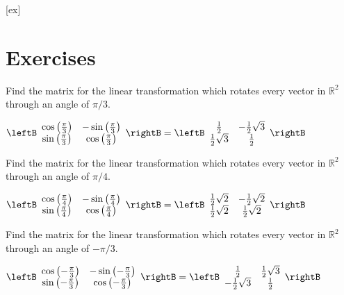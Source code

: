 [ex]
\section*{Exercises}

\begin{enumialphparenastyle}

\begin{ex}  Find the matrix for the linear transformation which
rotates every vector in $\mathbb{R}^{2}$ through an angle of $\pi /3.$
\begin{sol}
$\leftB
\begin{array}{cc}
\cos \left(
\frac{\pi }{3}\right) & -\sin \left( \frac{\pi }{3}\right) \\
\sin \left( \frac{\pi }{3}\right) & \cos \left( \frac{\pi }{3}\right)%
\end{array}
\rightB = \leftB
\begin{array}{cc}
\frac{1}{2} & -\frac{1}{2}\sqrt{3} \\
\frac{1}{2}\sqrt{3} & \frac{1}{2}
\end{array}
\rightB $
\end{sol}
\end{ex}


\begin{ex} Find the matrix for the linear transformation which rotates every
vector in $\mathbb{R}^{2}$ through an angle of $\pi /4.$
\begin{sol}
$\leftB
\begin{array}{cc}
\cos \left( \frac{\pi }{4}\right) & -\sin \left( \frac{\pi }{4}\right) \\
\sin \left( \frac{\pi }{4}\right) & \cos \left( \frac{\pi }{4}\right)
\end{array}
\rightB = \leftB
\begin{array}{cc}
\frac{1}{2}\sqrt{2} & -\frac{1}{2}\sqrt{2} \\
\frac{1}{2}\sqrt{2} & \frac{1}{2}\sqrt{2}
\end{array}
\rightB $
\end{sol}
\end{ex}

\begin{ex} Find the matrix for the linear transformation which rotates every
vector in $\mathbb{R}^{2}$ through an angle of $-\pi /3.$
\begin{sol}
$\leftB
\begin{array}{cc}
\cos \left( -\frac{\pi }{3}\right) & -\sin \left( -\frac{\pi }{3}\right) \\
\sin \left( -\frac{\pi }{3}\right) & \cos \left( -\frac{\pi }{3}\right)
\end{array}
\rightB = \leftB
\begin{array}{cc}
\frac{1}{2} & \frac{1}{2}\sqrt{3} \\
-\frac{1}{2}\sqrt{3} & \frac{1}{2}
\end{array}
\rightB $
\end{sol}
\end{ex}


\end{enumialphparenastyle}
